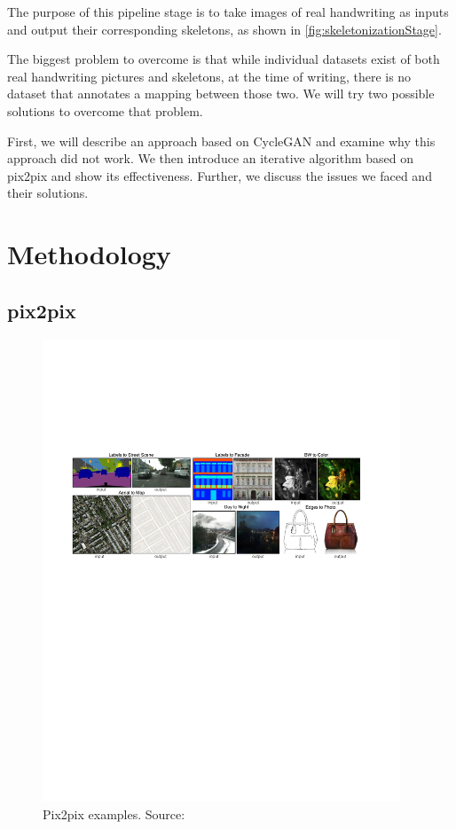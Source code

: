 The purpose of this pipeline stage is to take images of real handwriting as inputs and output their corresponding skeletons, as shown in \cref{fig:skeletonizationStage}.

The biggest problem to overcome is that while individual datasets exist of both real handwriting pictures and skeletons, at the time of writing, there is no dataset that annotates a mapping between those two. We will try two possible solutions to overcome that problem.

First, we will describe an approach based on \gls{CycleGAN} and examine why this approach did not work.
We then introduce an iterative algorithm based on \gls{pix2pix} and show its effectiveness. Further, we discuss the issues we faced and their solutions.

\section{Methodology}

\subsection{pix2pix}

\begin{figure}
  \centering
  \includegraphics[width=0.95\textwidth]{../assets/pix2pix_teaser.pdf}
  \caption[Pix2pix examples]{Pix2pix examples. Source:~\cite{pix2pix}}
  \label{fig:pix2pixExamples}
\end{figure}

